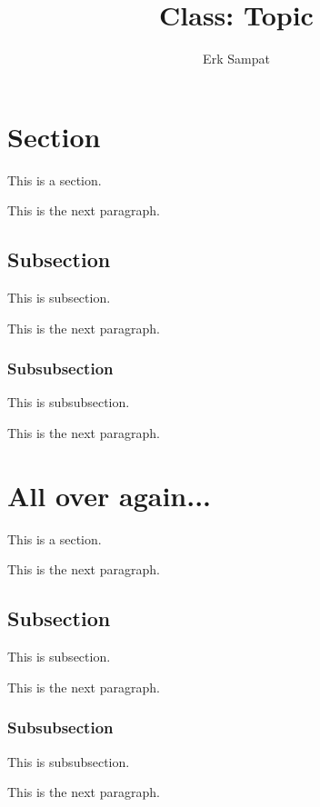 \title{{\selectfont Class: } Topic}
\author{Erk Sampat}



\maketitle
\section{Section}
This is a section.

This is the next paragraph.
\subsection{Subsection}
This is subsection.

This is the next paragraph.
\subsubsection{Subsubsection}
This is subsubsection.

This is the next paragraph.
\section{All over again...}
This is a section.

This is the next paragraph.
\subsection{Subsection}
This is subsection.

This is the next paragraph.
\subsubsection{Subsubsection}
This is subsubsection.

This is the next paragraph.
